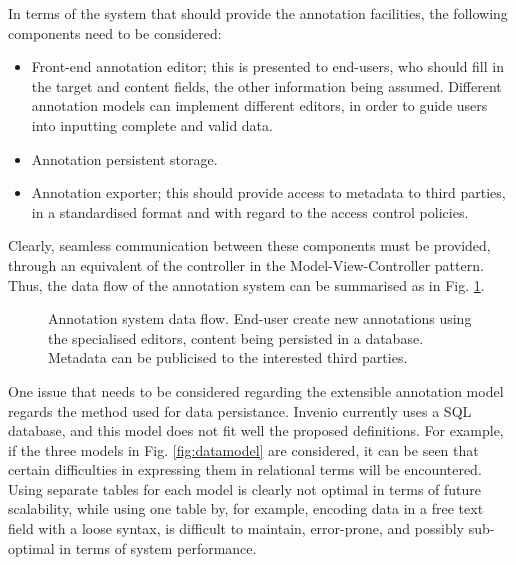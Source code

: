 In terms of the system that should provide the annotation facilities, the
following components need to be considered:
\begin{itemize}
  \item Front-end annotation editor; this is presented to end-users,
        who should fill in the target and content fields, the other information
        being assumed. Different annotation models can implement different
        editors, in order to guide users into inputting complete and valid data.
  \item Annotation persistent storage.
  \item Annotation exporter; this should provide access to metadata to third
        parties, in a standardised format and with regard to the access control
        policies.
\end{itemize}
Clearly, seamless communication between these components must be provided,
through an equivalent of the controller in the Model-View-Controller pattern.
Thus, the data flow of the annotation system can be summarised as in Fig.
\ref{fig:dataflow}.

\begin{figure}[!ht]
  \centering
  \caption[Annotation system data flow]
          {Annotation system data flow. End-user create new annotations using
           the specialised editors, content being persisted in a database.
           Metadata can be publicised to the interested third parties.}
  \label{fig:dataflow}
\end{figure}

One issue that needs to be considered regarding the extensible annotation model
regards the method used for data persistance. Invenio currently uses a SQL
database, and this model does not fit well the proposed definitions. For
example, if the three models in Fig. \ref{fig:datamodel} are considered, it can
be seen that certain difficulties in expressing them in relational terms will
be encountered. Using separate tables for each model is clearly not optimal in
terms of future scalability, while using one table by, for example, encoding
data in a free text field with a loose syntax, is difficult to maintain,
error-prone, and possibly sub-optimal in terms of system performance.

